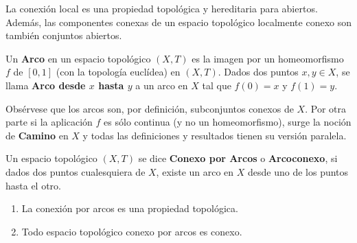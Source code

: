 \documentclass[cursovd_portada.tex]{subfiles}
\begin{document}
\begin{prop}
La conexión local es una propiedad topológica y hereditaria para abiertos. Además, las componentes conexas de un
espacio topológico localmente conexo son también conjuntos abiertos.
\end{prop}
\begin{defi}
Un {\bf Arco} en un espacio topológico $(X,T)$ es la imagen por un homeomorfismo $f$ de $[0,1]$ (con la topología
euclídea) en $(X,T)$. Dados dos puntos $x,y\in X$, se llama {\bf Arco desde $x$ hasta $y$} a un arco en $X$ tal
que $f(0)=x$ y $f(1)=y$.
\end{defi}
\begin{nota}
{\rm Obsérvese que los arcos son, por definición, subconjuntos conexos de $X$. Por otra parte si la aplicación $f$
es sólo continua (y no un homeomorfismo), surge la noción de {\bf Camino} en $X$ y todas las definiciones y
resultados tienen su versión paralela.}
\end{nota}
\begin{defi}
Un espacio topológico $(X,T)$ se dice {\bf Conexo por Arcos} o {\bf Arcoconexo}, si dados dos puntos cualesquiera
de $X$, existe un arco en $X$ desde uno de los puntos hasta el otro.
\end{defi}
\begin{prop}
\begin{enumerate}
\item La conexión por arcos es una propiedad topológica.
\item Todo espacio topológico conexo por arcos es conexo.
\end{enumerate}
\end{prop}
\end{document}
